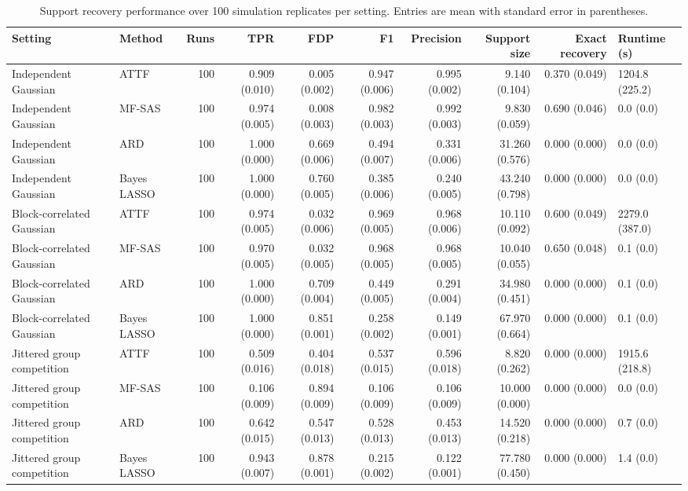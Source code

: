 \begin{table}
\caption{Support recovery performance over 100 simulation replicates per setting. Entries are mean with standard error in parentheses.}
\label{tab:support_recovery}
\begin{tabular}{llrrrrrrr}
\toprule
Setting & Method & Runs & TPR & FDP & F1 & Precision & Support size & Exact recovery & Runtime (s) \\
\midrule
Independent Gaussian & ATTF & 100 & 0.909 (0.010) & 0.005 (0.002) & 0.947 (0.006) & 0.995 (0.002) & 9.140 (0.104) & 0.370 (0.049) & 1204.8 (225.2) \\
Independent Gaussian & MF-SAS & 100 & 0.974 (0.005) & 0.008 (0.003) & 0.982 (0.003) & 0.992 (0.003) & 9.830 (0.059) & 0.690 (0.046) & 0.0 (0.0) \\
Independent Gaussian & ARD & 100 & 1.000 (0.000) & 0.669 (0.006) & 0.494 (0.007) & 0.331 (0.006) & 31.260 (0.576) & 0.000 (0.000) & 0.0 (0.0) \\
Independent Gaussian & Bayes LASSO & 100 & 1.000 (0.000) & 0.760 (0.005) & 0.385 (0.006) & 0.240 (0.005) & 43.240 (0.798) & 0.000 (0.000) & 0.0 (0.0) \\
Block-correlated Gaussian & ATTF & 100 & 0.974 (0.005) & 0.032 (0.006) & 0.969 (0.005) & 0.968 (0.006) & 10.110 (0.092) & 0.600 (0.049) & 2279.0 (387.0) \\
Block-correlated Gaussian & MF-SAS & 100 & 0.970 (0.005) & 0.032 (0.005) & 0.968 (0.005) & 0.968 (0.005) & 10.040 (0.055) & 0.650 (0.048) & 0.1 (0.0) \\
Block-correlated Gaussian & ARD & 100 & 1.000 (0.000) & 0.709 (0.004) & 0.449 (0.005) & 0.291 (0.004) & 34.980 (0.451) & 0.000 (0.000) & 0.1 (0.0) \\
Block-correlated Gaussian & Bayes LASSO & 100 & 1.000 (0.000) & 0.851 (0.001) & 0.258 (0.002) & 0.149 (0.001) & 67.970 (0.664) & 0.000 (0.000) & 0.1 (0.0) \\
Jittered group competition & ATTF & 100 & 0.509 (0.016) & 0.404 (0.018) & 0.537 (0.015) & 0.596 (0.018) & 8.820 (0.262) & 0.000 (0.000) & 1915.6 (218.8) \\
Jittered group competition & MF-SAS & 100 & 0.106 (0.009) & 0.894 (0.009) & 0.106 (0.009) & 0.106 (0.009) & 10.000 (0.000) & 0.000 (0.000) & 0.0 (0.0) \\
Jittered group competition & ARD & 100 & 0.642 (0.015) & 0.547 (0.013) & 0.528 (0.013) & 0.453 (0.013) & 14.520 (0.218) & 0.000 (0.000) & 0.7 (0.0) \\
Jittered group competition & Bayes LASSO & 100 & 0.943 (0.007) & 0.878 (0.001) & 0.215 (0.002) & 0.122 (0.001) & 77.780 (0.450) & 0.000 (0.000) & 1.4 (0.0) \\
\bottomrule
\end{tabular}
\end{table}
